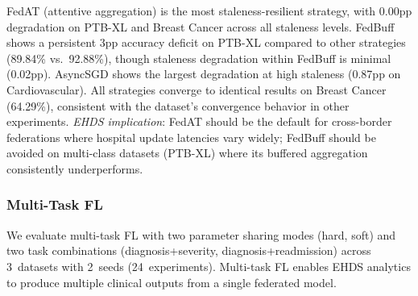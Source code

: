 \documentclass[conference]{IEEEtran}
\begin{document}
\begin{table}[htbp]
\centering
\caption{Asynchronous FL: Accuracy (\%) by Strategy and Staleness}
\label{tab:async_fl}

\vspace{1mm}
\footnotesize{FedAT (attentive aggregation) is the most staleness-resilient strategy, with 0.00pp degradation on PTB-XL and Breast Cancer across all staleness levels. FedBuff shows a persistent 3pp accuracy deficit on PTB-XL compared to other strategies (89.84\% vs.\ 92.88\%), though staleness degradation within FedBuff is minimal (0.02pp). AsyncSGD shows the largest degradation at high staleness (0.87pp on Cardiovascular). All strategies converge to identical results on Breast Cancer (64.29\%), consistent with the dataset's convergence behavior in other experiments. \textit{EHDS implication}: FedAT should be the default for cross-border federations where hospital update latencies vary widely; FedBuff should be avoided on multi-class datasets (PTB-XL) where its buffered aggregation consistently underperforms.}
\end{table}

\subsubsection{Multi-Task FL}
\label{sec:multitask_fl}

We evaluate multi-task FL with two parameter sharing modes (hard, soft) and two task combinations (diagnosis+severity, diagnosis+readmission) across 3~datasets with 2~seeds (24~experiments). Multi-task FL enables EHDS analytics to produce multiple clinical outputs from a single federated model.
\end{document}
